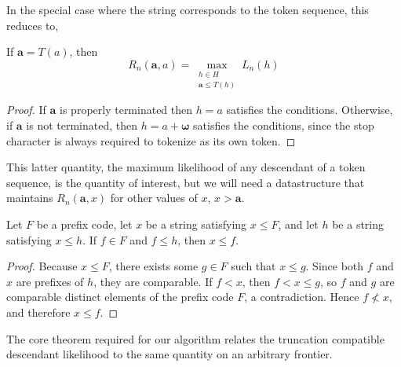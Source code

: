 In the special case where the string corresponds to the token sequence, this reduces to,
\begin{lemma}
    If $\mathbf{a} = T(a)$, then
    $$
    R_n(\mathbf{a}, a) = \max_{\substack{h \in H \\ \mathbf{a} \leq T(h)}} L_n(h)
    $$
\end{lemma}
\begin{proof}
    If $\mathbf{a}$ is properly terminated then $h = a$ satisfies the conditions.
    Otherwise, if $\mathbf{a}$ is not terminated, then $h = a + \boldsymbol{\omega}$ satisfies the conditions,
    since the stop character is always required to tokenize as its own token.
\end{proof}
This latter quantity, the maximum likelihood of any descendant of a token sequence, is the quantity of interest,
but we will need a datastructure that maintains $R_n(\mathbf{a}, x)$ for other values of $x$, $x > \mathbf{a}$.

    \begin{lemma}
    \label{lemma:frontier-ancestor-extending-covered-prefix}
        Let $F$ be a prefix code, let $x$ be a string satisfying $x \leq F$, and let $h$ be a string
        satisfying $x \leq h$. If $f \in F$ and $f \leq h$, then $x \leq f$.
    \end{lemma}
    \begin{proof}
        Because $x \leq F$, there exists some $g \in F$ such that $x \leq g$.
        Since both $f$ and $x$ are prefixes of $h$, they are comparable. If $f < x$, then
        $f < x \leq g$, so $f$ and $g$ are comparable distinct elements of the prefix code $F$,
        a contradiction. Hence $f \not< x$, and therefore $x \leq f$.
    \end{proof}

The core theorem required for our algorithm relates the truncation compatible descendant likelihood to the same quantity on
an arbitrary frontier.

